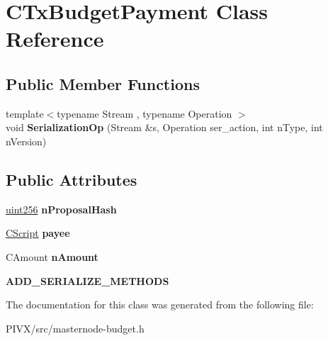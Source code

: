 \hypertarget{class_c_tx_budget_payment}{}\section{C\+Tx\+Budget\+Payment Class Reference}
\label{class_c_tx_budget_payment}
\subsection*{Public Member Functions}
\begin{DoxyCompactItemize}
\item 
\mbox{\label{class_c_tx_budget_payment_a31bd09c40afac565c4cc2dfd48a5b564}} 
{\footnotesize template$<$typename Stream , typename Operation $>$ }\\void {\bfseries Serialization\+Op} (Stream \&s, Operation ser\+\_\+action, int n\+Type, int n\+Version)
\end{DoxyCompactItemize}
\subsection*{Public Attributes}
\begin{DoxyCompactItemize}
\item 
\mbox{\label{class_c_tx_budget_payment_a288dd5a0cd2ba5761d688b77dae5b375}} 
\mbox{\hyperlink{classuint256}{uint256}} {\bfseries n\+Proposal\+Hash}
\item 
\mbox{\label{class_c_tx_budget_payment_a503a9395a6f3ff0e1d81104a3dbf5697}} 
\mbox{\hyperlink{class_c_script}{C\+Script}} {\bfseries payee}
\item 
\mbox{\label{class_c_tx_budget_payment_ac127187725282a338d140efe8ee2c4a7}} 
C\+Amount {\bfseries n\+Amount}
\item 
\mbox{\label{class_c_tx_budget_payment_a27f26b8d9973aa88f7b6bf2e908258ce}} 
{\bfseries A\+D\+D\+\_\+\+S\+E\+R\+I\+A\+L\+I\+Z\+E\+\_\+\+M\+E\+T\+H\+O\+DS}
\end{DoxyCompactItemize}


The documentation for this class was generated from the following file\+:\begin{DoxyCompactItemize}
\item 
P\+I\+V\+X/src/masternode-\/budget.\+h\end{DoxyCompactItemize}
